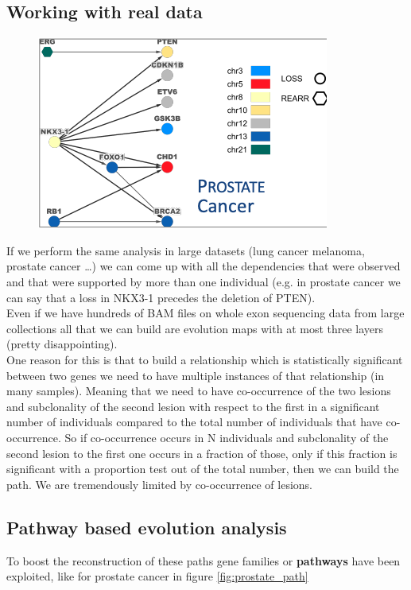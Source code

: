 \subsection{Working with real data}


\begin{figure}[H]
\centering
\includegraphics[width=0.5\linewidth]{image6.png}
\caption{}
\label{fig:real}
\end{figure}


If we perform the same analysis in large datasets (lung cancer melanoma, prostate cancer \ldots) we can come up with all the dependencies that were observed and that were supported by more
than one individual (e.g. in prostate cancer we can say that a loss in NKX3-1 precedes the deletion of PTEN).
\\
Even if we have hundreds of BAM files on whole exon sequencing data from large collections all that we can build are evolution maps with at most three layers (pretty disappointing).
\\
One reason for this is that to build a relationship which is statistically significant between two genes we need to have multiple instances of that relationship (in many samples).
Meaning that we need to have co-occurrence of the two lesions and subclonality of the second lesion with respect to the first in a significant number of individuals compared to the total number of individuals that have co-occurrence.
So if co-occurrence occurs in N individuals and subclonality of the second lesion to the first one occurs in a fraction of those, only if this fraction is significant with a proportion test out of the total number, then we can build the path. We are tremendously limited by co-occurrence of lesions.
\\
\subsection{Pathway based evolution analysis}
To boost the reconstruction of these paths gene families or \textbf{pathways} have been exploited, like for prostate cancer in figure \ref{fig:prostate_path}

